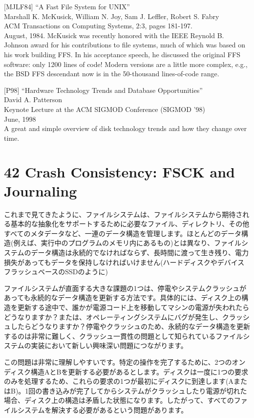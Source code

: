 {[}MJLF84{]} ``A Fast File System for UNIX''\\
Marshall K. McKusick, William N. Joy, Sam J. Leffler, Robert S. Fabry\\
ACM Transactions on Computing Systems, 2:3, pages 181-197.\\
August, 1984. McKusick was recently honored with the IEEE Reynold B.
Johnson award for his contributions to file systems, much of which was
based on his work building FFS. In his acceptance speech, he discussed
the original FFS software: only 1200 lines of code! Modern versions are
a little more complex, e.g., the BSD FFS descendant now is in the
50-thousand lines-of-code range.

{[}P98{]} ``Hardware Technology Trends and Database Opportunities''\\
David A. Patterson\\
Keynote Lecture at the ACM SIGMOD Conference (SIGMOD '98)\\
June, 1998\\
A great and simple overview of disk technology trends and how they
change over time.

\hypertarget{crash-consistency-fsck-and-journaling}{%
\section*{42 Crash Consistency: FSCK and
Journaling}\label{crash-consistency-fsck-and-journaling}}

これまで見てきたように、ファイルシステムは、ファイルシステムから期待される基本的な抽象化をサポートするために必要なファイル、ディレクトリ、その他すべてのメタデータなど、一連のデータ構造を管理します。ほとんどのデータ構造(例えば、実行中のプログラムのメモリ内にあるもの)とは異なり、ファイルシステムのデータ構造は永続的でなければならず、長時間に渡って生き残り、電力損失があってもデータを保持しなければいけません(ハードディスクやデバイスフラッシュベースのSSDのように)

ファイルシステムが直面する大きな課題の1つは、停電やシステムクラッシュがあっても永続的なデータ構造を更新する方法です。具体的には、ディスク上の構造を更新する途中で、誰かが電源コード上を移動してマシンの電源が失われたらどうなりますか？または、オペレーティングシステムにバグが発生し、クラッシュしたらどうなりますか？停電やクラッシュのため、永続的なデータ構造を更新するのは非常に難しく、クラッシュ一貫性の問題として知られているファイルシステムの実装において新しい興味深い問題につながります。

この問題は非常に理解しやすいです。特定の操作を完了するために、2つのオンディスク構造AとBを更新する必要があるとします。ディスクは一度に1つの要求のみを処理するため、これらの要求の1つが最初にディスクに到達します(AまたはB)。1回の書き込みが完了してからシステムがクラッシュしたり電源が切れた場合、ディスク上の構造は矛盾した状態になります。したがって、すべてのファイルシステムを解決する必要があるという問題があります。

